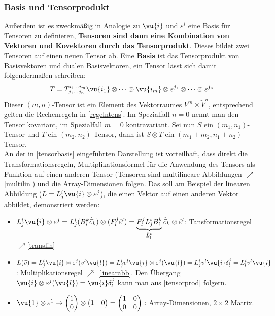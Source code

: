 		\subsubsection{Basis und Tensorprodukt}
	Außerdem ist es zweckmäßig in Analogie zu $\vu{i}$ und $\varepsilon^i$ eine Basis für Tensoren zu definieren, \textbf{Tensoren sind dann eine Kombination von Vektoren und Kovektoren durch das Tensorprodukt}. Dieses bildet zwei Tensoren auf einen neuen Tensor ab. Eine \textbf{Basis} ist das Tensorprodukt von Basisvektoren und dualen Basisvektoren, ein Tensor lässt sich damit folgendermaßen schreiben:
	\begin{equation}\label{tensorbasis}
		T=T^{i_1\dots i_m}_{j_1\dots j_n}\vu{{i_1}}\otimes\dots\otimes\vu{{i_m}}\otimes\varepsilon^{j_1}\otimes\dots\otimes\varepsilon^{j_n}
	\end{equation}
	Dieser $(m,n)$-Tensor ist ein Element des Vektorraumes $V^{ m}\times \tilde{V}^n$, entsprechend gelten die Rechenregeln in \ref{regelntens}. Im Spezialfall $n=0$ nennt man den Tensor kovariant, im Spezialfall $m=0$ kontravariant. Sei nun $S$ ein $(m_1,n_1)$-Tensor und $T$ ein $(m_2,n_2)$-Tensor, dann ist $S\otimes T$ ein $(m_1+m_2,n_1+n_2)$-Tensor.\\
	 An der in \ref{tensorbasis} eingeführten Darstellung ist vorteilhaft, dass direkt die Transformationsregeln, Multiplikationsformel für die Anwendung des Tensors als Funktion auf einen anderen Tensor (Tensoren sind multilineare Abbildungen $\nearrow$\ref{multilin}) und die Array-Dimensionen folgen. Das soll am Beispiel der linearen Abbildung ($L=L^i_j\vu{i}\otimes\varepsilon^j$), die einen Vektor auf einen anderen Vektor abbildet, demonstriert werden:
	\begin{itemize}
		\item $L^i_j\vu{i}\otimes\varepsilon^j=L^i_j(B_i^k\hat{\vec{e}}_k)\otimes (F^j_l \hat{\varepsilon}^l)=\underbrace{F^j_l L^i_j B_i^k}_{\hat{L}^k_l} \hat{\vec{e}}_k \otimes\hat{\varepsilon}^l$: Tansformationsregel $\nearrow$\ref{translin}
		\item $L(\vec{v})=L^i_j\vu{i}\otimes\varepsilon^j(v^l\vu{l})=L^i_jv^l\vu{i}\otimes\varepsilon^j(\vu{l})=L^i_jv^l\vu{i}\delta^j_l=L^i_lv^l\vu{i}$: Multiplikationsregel $\nearrow$ \ref{linearabb}. Den Übergang $\vu{i}\otimes\varepsilon^j(\vu{l})=\vu{i}\delta^j_l$ kann man aus \ref{tensorprod} folgern.
		\item $\vu{1}\otimes\varepsilon^1\to \begin{pmatrix}
			1\\
			0
		\end{pmatrix}\otimes \begin{pmatrix}
		1 & 0
		\end{pmatrix}=\begin{pmatrix}
		1 & 0 \\
		0 & 0
		\end{pmatrix}:$ Array-Dimensionen, $2\times 2$ Matrix.
	\end{itemize}
